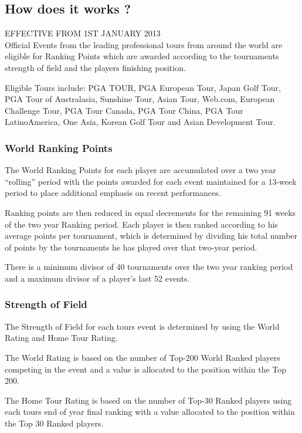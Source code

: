 \documentclass{article}
\begin{document}
\subsection{How does it works ?}
EFFECTIVE FROM 1ST JANUARY 2013\\
Official Events from the leading professional tours from around the world are eligible for Ranking Points which are awarded according to the tournaments strength of field and the players finishing position.

Eligible Tours include: PGA TOUR, PGA European Tour, Japan Golf Tour, PGA Tour of Australasia, Sunshine Tour, Asian Tour, Web.com, European Challenge Tour, PGA Tour Canada, PGA Tour China, PGA Tour LatinoAmerica, One Asia, Korean Golf Tour and Asian Development Tour.

\subsubsection{World Ranking Points}

The World Ranking Points for each player are accumulated over a two year “rolling” period with the points awarded for each event maintained for a 13-week period to place additional emphasis on recent performances.

Ranking points are then reduced in equal decrements for the remaining 91 weeks of the two year Ranking period. Each player is then ranked according to his average points per tournament, which is determined by dividing his total number of points by the tournaments he has played over that two-year period.

There is a minimum divisor of 40 tournaments over the two year ranking period and a maximum divisor of a player’s last 52 events.

\subsubsection{Strength of Field}

The Strength of Field for each tours event is determined by using the World Rating and Home Tour Rating.

The World Rating is based on the number of Top-200 World Ranked players competing in the event and a value is allocated to the position within the Top 200.

The Home Tour Rating is based on the number of Top-30 Ranked players using each tours end of year final ranking with a value allocated to the position within the Top 30 Ranked players.
\end{document}
